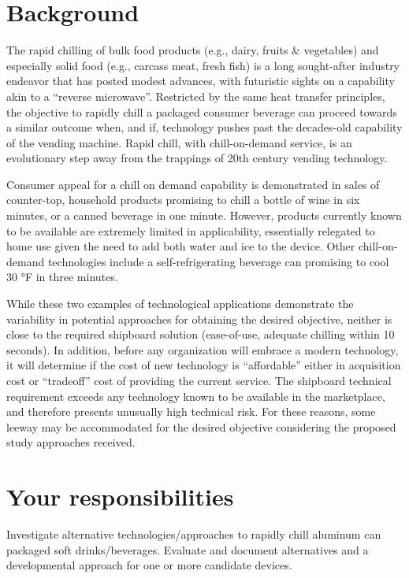 \documentclass[
]{book}
\begin{document}
\hypertarget{background}{%
\section{Background}\label{background}}

The rapid chilling of bulk food products (e.g., dairy, fruits \& vegetables) and especially solid food (e.g., carcass meat, fresh fish) is a long sought-after industry endeavor that has posted modest advances, with futuristic sights on a capability akin to a ``reverse microwave''. Restricted by the same heat transfer principles, the objective to rapidly chill a packaged consumer beverage can proceed towards a similar outcome when, and if, technology pushes past the decades-old capability of the vending machine. Rapid chill, with chill-on-demand service, is an evolutionary step away from the trappings of 20th century vending technology.

Consumer appeal for a chill on demand capability is demonstrated in sales of counter-top, household products promising to chill a bottle of wine in six minutes, or a canned beverage in one minute. However, products currently known to be available are extremely limited in applicability, essentially relegated to home use given the need to add both water and ice to the device. Other chill-on-demand technologies include a self-refrigerating beverage can promising to cool 30 °F in three minutes.

While these two examples of technological applications demonstrate the variability in potential approaches for obtaining the desired objective, neither is close to the required shipboard solution (ease-of-use, adequate chilling within 10 seconds). In addition, before any organization will embrace a modern technology, it will determine if the cost of new technology is ``affordable'' either in acquisition cost or ``tradeoff'' cost of providing the current service. The shipboard technical requirement exceeds any technology known to be available in the marketplace, and therefore presents unusually high technical risk. For these reasons, some leeway may be accommodated for the desired objective considering the proposed study approaches received.

\hypertarget{your-responsibilities}{%
\section{Your responsibilities}\label{your-responsibilities}}

Investigate alternative technologies/approaches to rapidly chill aluminum can packaged soft drinks/beverages. Evaluate and document alternatives and a developmental approach for one or more candidate devices.
\end{document}

